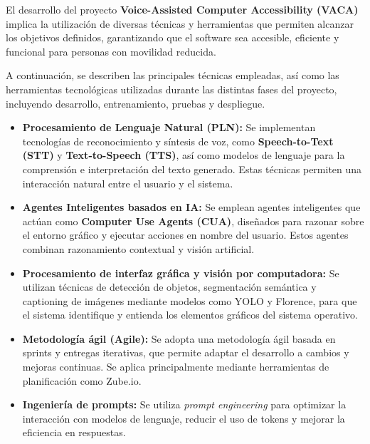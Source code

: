 
El desarrollo del proyecto \textbf{Voice-Assisted Computer Accessibility (VACA)} implica la utilización de diversas técnicas y herramientas que permiten alcanzar los objetivos definidos, garantizando que el software sea accesible, eficiente y funcional para personas con movilidad reducida.

A continuación, se describen las principales técnicas empleadas, así como las herramientas tecnológicas utilizadas durante las distintas fases del proyecto, incluyendo desarrollo, entrenamiento, pruebas y despliegue.

\begin{itemize}
    \item \textbf{Procesamiento de Lenguaje Natural (PLN):} Se implementan tecnologías de reconocimiento y síntesis de voz, como \textbf{Speech-to-Text (STT)} y \textbf{Text-to-Speech (TTS)}, así como modelos de lenguaje para la comprensión e interpretación del texto generado. Estas técnicas permiten una interacción natural entre el usuario y el sistema.

    \item \textbf{Agentes Inteligentes basados en IA:} Se emplean agentes inteligentes que actúan como \textbf{Computer Use Agents (CUA)}, diseñados para razonar sobre el entorno gráfico y ejecutar acciones en nombre del usuario. Estos agentes combinan razonamiento contextual y visión artificial.

    \item \textbf{Procesamiento de interfaz gráfica y visión por computadora:} Se utilizan técnicas de detección de objetos, segmentación semántica y captioning de imágenes mediante modelos como YOLO y Florence, para que el sistema identifique y entienda los elementos gráficos del sistema operativo.

    \item \textbf{Metodología ágil (Agile):} Se adopta una metodología ágil basada en sprints y entregas iterativas, que permite adaptar el desarrollo a cambios y mejoras continuas. Se aplica principalmente mediante herramientas de planificación como Zube.io.

    \item \textbf{Ingeniería de prompts:} Se utiliza \textit{prompt engineering} para optimizar la interacción con modelos de lenguaje, reducir el uso de tokens y mejorar la eficiencia en respuestas.
\end{itemize}

